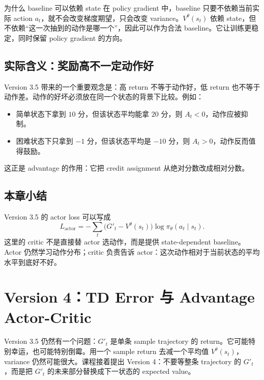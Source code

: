 \documentclass[a4paper]{article}
\newcommand{\policy}{\pi_\theta}
\newcommand{\val}{V^\theta}
\begin{document}
\begin{importantbox}{为什么 baseline 可以依赖 state}
    在 policy gradient 中，baseline 只要不依赖当前实际 action $a_t$，就不会改变梯度期望，只会改变 variance。$\val(s_t)$ 依赖 state，但不依赖``这一次抽到的动作是哪一个''，因此可以作为合法 baseline。它让训练更稳定，同时保留 policy gradient 的方向。
\end{importantbox}

\subsection{实际含义：奖励高不一定动作好}

Version 3.5 带来的一个重要观念是：高 return 不等于动作好，低 return 也不等于动作差。动作的好坏必须放在同一个状态的背景下比较。例如：
\begin{itemize}
    \item 简单状态下拿到 $10$ 分，但该状态平均能拿 $20$ 分，则 $A_t<0$，动作应被抑制。
    \item 困难状态下只拿到 $-1$ 分，但该状态平均是 $-10$ 分，则 $A_t>0$，动作反而值得鼓励。
\end{itemize}
这正是 advantage 的作用：它把 credit assignment 从绝对分数改成相对分数。

\subsection{本章小结}

Version 3.5 的 actor loss 可以写成
\[
    L_{\mathrm{actor}}
    =
    -\sum_t
    \bigl(G'_t-\val(s_t)\bigr)
    \log \policy(a_t\mid s_t).
\]
这里的 critic 不是直接替 actor 选动作，而是提供 state-dependent baseline。Actor 仍然学习动作分布；critic 负责告诉 actor：这次动作相对于当前状态的平均水平到底好不好。

\section{Version 4：TD Error 与 Advantage Actor-Critic}

Version 3.5 仍然有一个问题：$G'_t$ 是单条 sample trajectory 的 return。它可能特别幸运，也可能特别倒霉。用一个 sample return 去减一个平均值 $\val(s_t)$，variance 仍然可能很大。课程接着提出 Version 4：不要等整条 trajectory 的 $G'_t$，而是把 $G'_t$ 的未来部分替换成下一状态的 expected value。
\end{document}
